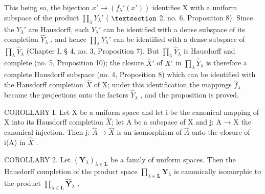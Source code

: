 This being so, the bijection \(x' \to (f_{\lambda}'(x'))\) identifies X with a uniform subspace of the product \(\prod_{\lambda} Y_{\lambda}'\) ( \(\S\) 2, no. 6, Proposition 8). Since the \(Y_{\lambda}'\) are Hausdorff, each \(Y_{\lambda}'\) can be identified with a dense subspace of its completion \(\hat{Y}_{\lambda}\) , and hence \(\prod_{\lambda} Y_{\lambda}'\) can be identified with a dense subspace of \(\prod_{\lambda} \hat{Y}_{\lambda}\) (Chapter I, § 4, no. 3, Proposition 7). But \(\prod_{\lambda} \hat{Y}_{\lambda}\) is Hausdorff and complete (no. 5, Proposition 10); the closure \(\overline{X}'\) of \(X'\) in \(\prod_{\lambda} \hat{Y}_{\lambda}\) is therefore a complete Hausdorff subspace (no. 4, Proposition 8) which can be identified with the Hausdorff completion \(\hat{X}\) of X; under this identification the mappings \(\hat{f}_{\lambda}\) become the projections onto the factors \(\hat{Y}_{\lambda}\) , and the proposition is proved.

COROLLARY I. Let X be a uniform space and let i be the canonical mapping of X into its Hausdorff completion \(\hat{X}\); let A be a subspace of X and j: A → X the canonical injection. Then j: \(\hat{A} \rightarrow \hat{X}\) is an isomorphism of \(\hat{A}\) onto the closure of i(A) in \(\hat{X}\) .

COROLLARY 2. Let \((\mathbf{Y}_{\lambda})_{\lambda \in \mathbf{L}}\) be a family of uniform spaces. Then the Hausdorff completion of the product space \(\prod_{\lambda \in \mathbf{L}}\mathbf{Y}_{\lambda}\) is canonically isomorphic to the product \(\prod_{\lambda \in \mathbf{L}}\hat{\mathbf{Y}}_{\lambda}\) .

